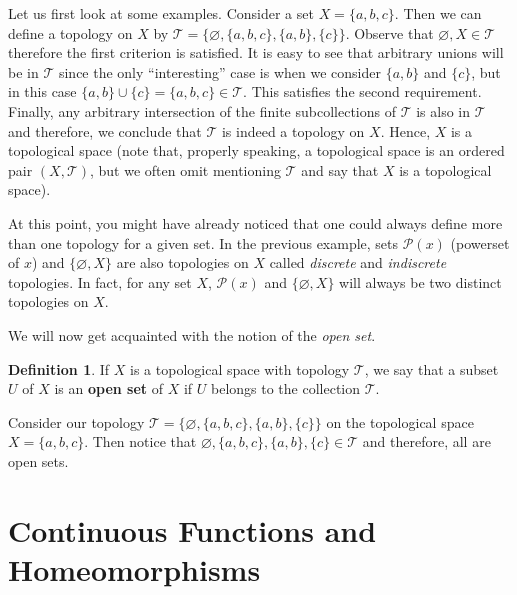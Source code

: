 \documentclass[12pt]{article}
\newcommand{\pset}{\mathcal{P}}                           %
\newcommand{\topology}{\mathcal{T}}                       %
\renewcommand{\emptyset}{\varnothing}                     %
\theoremstyle{definition}
\newtheorem*{definition}{Definition}
\begin{document}
Let us first look at some examples. Consider a set $X = \{a, b, c\}$.
Then we can define a topology on $X$ by $\topology = \{\emptyset, \{a, b, c\}, \{a, b\}, \{c\}\}$.
Observe that $\emptyset, X \in \topology$ therefore the first criterion is satisfied.
It is easy to see that arbitrary unions will be in $\topology$ since the only ``interesting''
case is when we consider $\{a, b\}$ and $\{c\}$, but in this case $\{a, b\} \cup \{c\} = \{a, b, c\} \in \topology$.
This satisfies the second requirement. Finally, any arbitrary intersection of the finite subcollections of $\topology$
is also in $\topology$ and therefore, we conclude that $\topology$ is indeed a topology on $X$.
Hence, $X$ is a topological space (note that, properly speaking, a topological space is an ordered pair $(X, \topology)$,
but we often omit mentioning $\topology$ and say that $X$ is a topological space).

\bigskip

At this point, you might have already noticed that one could always define more than one topology
for a given set. In the previous example, sets $\pset{(x)}$ (powerset of $x$) and $\{\emptyset, X\}$
are also topologies on $X$ called \textit{discrete} and \textit{indiscrete} topologies. In fact, for any set $X$,
$\pset{(x)}$ and $\{\emptyset, X\}$ will always be two distinct topologies on $X$.

\bigskip

We will now get acquainted with the notion of the \textit{open set}.

\begin{definition}
\cite{4}  If $X$ is a topological space with topology $\topology$, we say that a subset $U$ of $X$ is an
\textbf{open set} of $X$ if $U$ belongs to the collection $\topology$.
\end{definition}

Consider our topology $\topology = \{\emptyset, \{a, b, c\}, \{a, b\}, \{c\}\}$ on the topological space $X = \{a, b, c\}$.
Then notice that $\emptyset, \{a, b, c\}, \{a, b\}, \{c\} \in \topology$ and therefore, all are open sets.


\section*{\centering Continuous Functions and Homeomorphisms}
\end{document}
